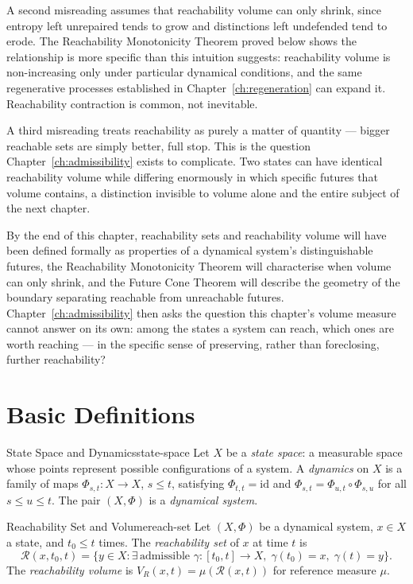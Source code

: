 \documentclass[12pt,twoside,openright]{book}
\newcommand{\reach}{\mathcal{R}}
\begin{document}
A second misreading assumes that reachability volume can only
shrink, since entropy left unrepaired tends to grow and
distinctions left undefended tend to erode. The Reachability
Monotonicity Theorem proved below shows the relationship is
more specific than this intuition suggests: reachability
volume is non-increasing only under particular dynamical
conditions, and the same regenerative processes established
in Chapter~\ref{ch:regeneration} can expand it. Reachability
contraction is common, not inevitable.

A third misreading treats reachability as purely a matter of
quantity --- bigger reachable sets are simply better, full
stop. This is the question Chapter~\ref{ch:admissibility}
exists to complicate. Two states can have identical
reachability volume while differing enormously in which
specific futures that volume contains, a distinction
invisible to volume alone and the entire subject of the next
chapter.

By the end of this chapter, reachability sets and reachability
volume will have been defined formally as properties of a
dynamical system's distinguishable futures, the Reachability
Monotonicity Theorem will characterise when volume can only
shrink, and the Future Cone Theorem will describe the
geometry of the boundary separating reachable from
unreachable futures. Chapter~\ref{ch:admissibility} then asks
the question this chapter's volume measure cannot answer on
its own: among the states a system can reach, which ones are
worth reaching --- in the specific sense of preserving, rather
than foreclosing, further reachability?

\section{Basic Definitions}
\label{sec:ch13-defs}

\begin{definition}{State Space and Dynamics}{state-space}
  Let $X$ be a \emph{state space}: a measurable space whose
  points represent possible configurations of a system. A
  \emph{dynamics} on $X$ is a family of maps
  $\Phi_{s,t} : X \to X$, $s \le t$, satisfying
  $\Phi_{t,t} = \mathrm{id}$ and
  $\Phi_{s,t} = \Phi_{u,t} \circ \Phi_{s,u}$ for all
  $s \le u \le t$. The pair $(X,\Phi)$ is a \emph{dynamical
  system}.
\end{definition}

\begin{definition}{Reachability Set and Volume}{reach-set}
  Let $(X,\Phi)$ be a dynamical system, $x\in X$ a state,
  and $t_0 \le t$ times. The \emph{reachability set} of $x$
  at time $t$ is
  \[
    \reach(x,t_0,t) = \{
      y\in X : \exists\, \text{admissible }
      \gamma:[t_0,t]\to X,\;
      \gamma(t_0)=x,\; \gamma(t)=y
    \}.
  \]
  The \emph{reachability volume} is
  $V_R(x,t) = \mu(\reach(x,t))$ for reference measure $\mu$.
\end{definition}
\end{document}
